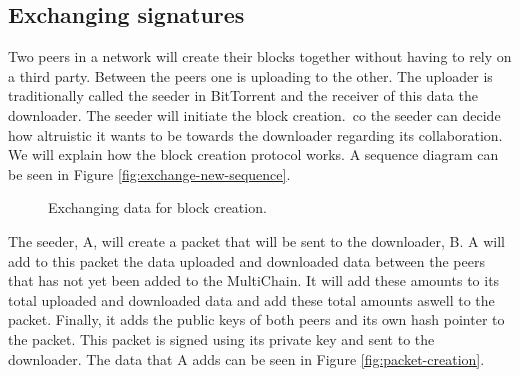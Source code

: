 \subsection{Exchanging signatures}
Two peers in a network will create their blocks together without having to rely on a third party.
Between the peers one is uploading to the other.
The uploader is traditionally called the seeder in BitTorrent and the receiver of this data the downloader\cite{Cohen-bittorrent}.
The seeder will initiate the block creation.\,
co the seeder can decide how altruistic it wants to be towards the downloader regarding its collaboration.
We will explain how the block creation protocol works.
A sequence diagram can be seen in Figure \ref{fig:exchange-new-sequence}.

\begin{figure}[tpb]
\centering
{}

\caption{Exchanging data for block creation.}
\label{fig:block-creation-new}
\end{figure}

The seeder, A, will create a packet that will be sent to the downloader, B.
A will add to this packet the data uploaded and downloaded data between the peers
that has not yet been added to the MultiChain.
It will add these amounts to its total uploaded and downloaded data
and add these total amounts aswell to the packet.
Finally, it adds the public keys of both peers and its own hash pointer to the packet.
This packet is signed using its private key and sent to the downloader.
The data that A adds can be seen in Figure \ref{fig:packet-creation}.

